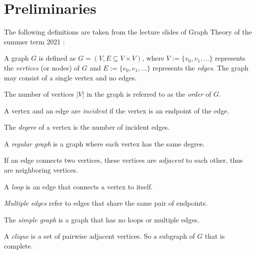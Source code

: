 \section{Preliminaries}\label{sec:prelimn}
The following definitions are taken from the lecture slides of Graph Theory of the summer term 2021 \cite{GraphTheorySchindelhaauer2021}:
\begin{definition}
    A graph $G$ is defined as $G = (V, E \subseteq V \times V)$, where $V := \{v_0, v_1,...\}$ represents the \textit{vertices} (or nodes) of $G$ and $E := \{e_0, e_1,...\}$ represents the \textit{edges}. The graph may consist of a single vertex and no edges.
\end{definition}

\begin{definition}
    The number of vertices $|V|$ in the graph is referred to as the \textit{order} of $G$.
    
    A vertex and an edge are \textit{incident} if the vertex is an endpoint of the edge.
    
    The \textit{degree} of a vertex is the number of incident edges.
\end{definition}

\begin{definition}
    A \textit{regular graph} is a graph where each vertex has the same degree.
\end{definition}

\begin{definition}[Adjacent]
    If an edge connects two vertices, these vertices are \textit{adjacent} to each other, thus are neighboring vertices.
\end{definition}

\begin{definition}
    A \textit{loop} is an edge that connects a vertex to itself.
    
    \textit{Multiple edges} refer to edges that share the same pair of endpoints.
    
    The \textit{simple graph} is a graph that has no loops or multiple edges.
\end{definition}

\begin{definition}[Clique]
    A \textit{clique} is a set of pairwise adjacent vertices. So a subgraph of $G$ that is complete.
\end{definition}

